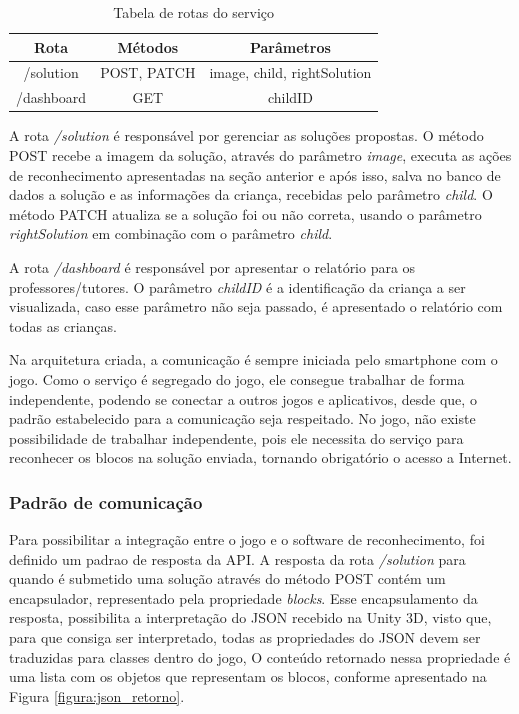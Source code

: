     \begin{table}[H]
        \centering
        \caption{Tabela de rotas do serviço}
        \label{tab:rotas}
        \begin{tabular}{|c|c|c|}
            \hline
            {Rota} & {Métodos} & {Parâmetros}  \\ \hline
            /solution & POST, PATCH & image, child, rightSolution \\ \hline
            /dashboard & GET & childID \\ \hline
        \end{tabular}
    \end{table}
    
    A rota \textit{/solution} é responsável por gerenciar as soluções propostas. O método POST recebe a imagem da solução, através do parâmetro \textit{image}, executa as ações de reconhecimento apresentadas na seção anterior e após isso, salva no banco de dados a solução e as informações da criança, recebidas pelo parâmetro \textit{child}. O método PATCH atualiza se a solução foi ou não correta, usando o parâmetro \textit{rightSolution} em combinação com o parâmetro \textit{child}.
    
    A rota \textit{/dashboard} é responsável por apresentar o relatório para os professores/tutores. O parâmetro \textit{childID} é a identificação da criança a ser visualizada, caso esse parâmetro não seja passado, é apresentado o relatório com todas as crianças.
    
    Na arquitetura criada, a comunicação é sempre iniciada pelo smartphone com o jogo. Como o serviço é segregado do jogo, ele consegue trabalhar de forma independente, podendo se conectar a outros jogos e aplicativos, desde que, o padrão estabelecido para a comunicação seja respeitado. No jogo, não existe possibilidade de trabalhar independente, pois ele necessita do serviço para reconhecer os blocos na solução enviada, tornando obrigatório o acesso a Internet.
    
    \subsubsection{Padrão de comunicação}
    
    Para possibilitar a integração entre o jogo e o software de reconhecimento, foi definido um padrao de resposta da API. A resposta da rota \textit{/solution} para quando é submetido uma solução através do método POST contém um encapsulador, representado pela propriedade \textit{blocks}. Esse encapsulamento da resposta, possibilita a interpretação do JSON recebido na Unity 3D, visto que, para que consiga ser interpretado, todas as propriedades do JSON devem ser traduzidas para classes dentro do jogo, O conteúdo retornado nessa propriedade é uma lista com os objetos que representam os blocos, conforme apresentado na Figura \ref{figura:json_retorno}.
    
